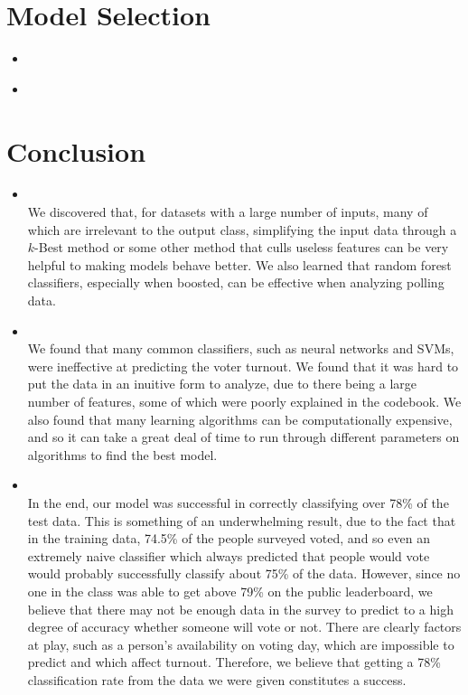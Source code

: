\section{Model Selection}
\medskip
\begin{itemize}

    \item {} \\

    \item {} \\

\end{itemize}



\section{Conclusion}
\medskip
\begin{itemize}

    \item {} \\
    We discovered that, for datasets with a large number of inputs, many of which are irrelevant to the output class, simplifying the input data through a $k$-Best method or some other method that culls useless features can be very helpful to making models behave better. We also learned that random forest classifiers, especially when boosted, can be effective when analyzing polling data.

    \item {} \\
    We found that many common classifiers, such as neural networks and SVMs, were ineffective at predicting the voter turnout. We found that it was hard to put the data in an inuitive form to analyze, due to there being a large number of features, some of which were poorly explained in the codebook. We also found that many learning algorithms can be computationally expensive, and so it can take a great deal of time to run through different parameters on algorithms to find the best model.

    \item {} \\
    In the end, our model was successful in correctly classifying over 78\% of the test data. This is something of an underwhelming result, due to the fact that in the training data, 74.5\% of the people surveyed voted, and so even an extremely naive classifier which always predicted that people would vote would probably successfully classify about 75\% of the data. However, since no one in the class was able to get above 79\% on the public leaderboard, we believe that there may not be enough data in the survey to predict to a high degree of accuracy whether someone will vote or not. There are clearly factors at play, such as a person's availability on voting day, which are impossible to predict and which affect turnout. Therefore, we believe that getting a 78\% classification rate from the data we were given constitutes a success.

\end{itemize}




